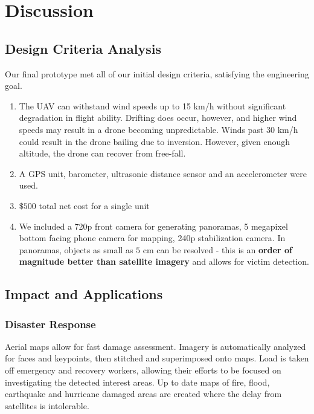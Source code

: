 
\section{Discussion}						%

\subsection{Design Criteria Analysis}

Our final prototype met all of our initial design criteria, satisfying the engineering goal.

\begin{enumerate}
	\item The UAV can withstand wind speeds up to 15 km/h without significant degradation in flight ability. Drifting does occur, however, and higher wind speeds may result in a drone becoming unpredictable. Winds past 30 km/h could result in the drone bailing due to inversion. However, given enough altitude, the drone can recover from free-fall.
	\item A GPS unit, barometer, ultrasonic distance sensor and an accelerometer were used.
	\item $\$500$ total net cost for a single unit
	\item We included a 720p front camera for generating panoramas, 5 megapixel bottom facing phone camera for mapping, 240p stabilization camera. In panoramas, objects as small as $5$ cm can be resolved - this is an \textbf{order of magnitude better than satellite imagery} and allows for victim detection.
\end{enumerate}

\subsection{Impact and Applications}

\subsubsection{Disaster Response}
Aerial maps allow for fast damage assessment. Imagery is automatically analyzed for faces and keypoints, then stitched and superimposed onto maps. Load is taken off emergency and recovery workers, allowing their efforts to be focused on investigating the detected interest areas. Up to date maps of fire, flood, earthquake and hurricane damaged areas are created where the delay from satellites is intolerable.

